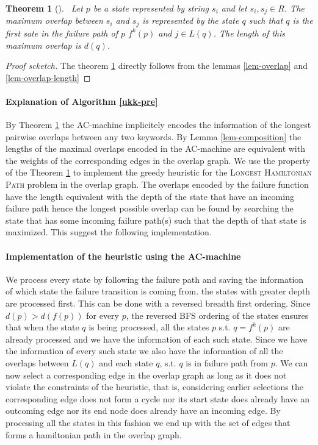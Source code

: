 \documentclass[english,twoside,censored,csm,algorithms-track-2020]{HYthesisML}
\theoremstyle{plain}
\newtheorem{theorem}{Theorem}[chapter]
\theoremstyle{definition}
\begin{document}
\begin{theorem}[] ~\label{thm-maximal-overlaps}
  Let $p$ be a state represented by string $s_i$ and let $s_i,s_j\in R$. The maximum overlap between
  $s_i$ and $s_j$ is represented by the state $q$ such that $q$ is the first sate in the failure
  path of $p$ $f^k(p)$ and $j\in L(q)$. The length of this maximum overlap is $d(q)$.
\end{theorem}
\begin{proof}[Proof scketch]
  The theorem \ref{thm-maximal-overlaps} directly follows from the lemmas \ref{lem-overlap} and \ref{lem-overlap-length}
\end{proof}

\paragraph{Explanation of Algorithm \ref{ukk-pre}}
By Theorem \ref{thm-maximal-overlaps} the AC-machine implicitely encodes the information of the
longest pairwise overlaps between any two keywords. By Lemma \ref{lem-composition} the lengths of the
maximal overlaps encoded in the AC-machine are equivalent with the weights of the corresponding edges
in the overlap graph. We use the property of the Theorem \ref{thm-maximal-overlaps} to implement
the greedy heuristic for the \textsc{Longest Hamiltonian Path} problem in the overlap graph. The
overlaps encoded by the failure function have the length equivalent with the depth of the state that
have an incoming failure path hence the longest possible overlap can be found by searching the state
that has some incoming failure path(s) such that the depth of that state is maximized. This suggest
the following implementation.

\paragraph{Implementation of the heuristic using the AC-machine}
We process every state by following the failure path and saving the
information of which state the failure transition is coming from. 
the states with greater depth are processed first. This can be done with a reversed breadth
first ordering. Since $d(p) > d(f(p))$ for every $p$, the reversed BFS ordering of the states
ensures that when the state $q$ is being processed, all the states $p$ s.t. $q=f^k(p)$ are already
processed and we have the information of each such state. Since we have the information of every such
state we also have the information of all the overlaps between $L(q)$ and each state $q$, s.t.
$q$ is in failure path from $p$. We can now select a corresponding edge in the overlap graph as long
as it does not violate the constraints of the heuristic, that is, considering earlier selections
the corresponding edge does not form a cycle nor its start state does already have an outcoming
edge nor its end node does already have an incoming edge. By processing all the states in this
fashion we end up with the set of edges that forms a hamiltonian path in the
overlap graph. 
\end{document}
